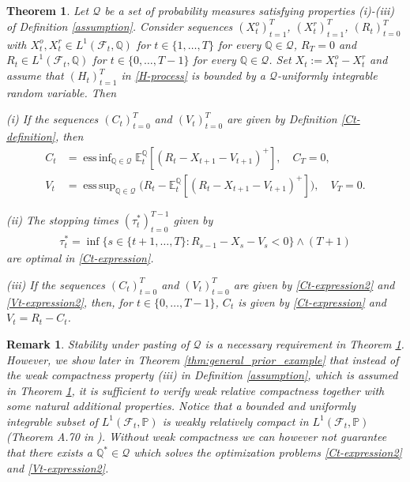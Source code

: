\documentclass[11pt,a4paper]{article}
\newtheorem{theorem}{Theorem}
\newtheorem{remark}{Remark}
\newcommand{\E}{\mathbb{E}}
\DeclareMathOperator*{\esssup}{ess\,sup}
\DeclareMathOperator*{\essinf}{ess\,inf}
\renewcommand{\P}{\mathbb{P}}
\newcommand{\Q}{\mathbb{Q}}
\newcommand{\calF}{\mathcal{F}}
\newcommand{\calQ}{\mathcal{Q}}
\begin{document}
\begin{theorem}\label{Vt-def-thm} 
Let $\calQ$ be a set of probability measures satisfying properties (i)-(iii) of Definition \ref{assumption}. 
Consider sequences $(X^{o}_t)_{t=1}^T$, $(X^{r}_t)_{t=1}^T$, $(R_t)_{t=0}^T$ with $X^{o}_t,X^{r}_t\in L^{1}(\calF_t,\Q)$ for $t\in \{1,\dots,T\}$ for every $\Q\in\mathcal{Q}$, $R_T=0$ and $R_t\in L^{1}(\calF_t,\Q)$ for $t\in \{0,\dots,T-1\}$ for every $\Q\in\calQ$. Set $X_t:=X^{o}_t-X^{r}_t$ and assume that $(H_t)_{t=1}^T$ in \eqref{H-process} is bounded by a $\calQ$-uniformly integrable random variable. Then  

(i) 
If the sequences $(C_t)_{t=0}^T$ and $(V_t)_{t=0}^T$ are given by Definition \ref{Ct-definition}, then 
\begin{align} 
C_t &= \essinf_{\Q \in \calQ} \E_t^{\Q}[(R_t-X_{t+1}-V_{t+1})^+], \quad C_T=0, \label{Ct-expression2}\\
V_t &= \esssup_{\Q \in \calQ} \Big(R_t-\E_t^{\Q}[(R_t-X_{t+1}-V_{t+1})^+]\Big), \quad V_T=0. \label{Vt-expression2}
\end{align}

(ii) 
The stopping times $(\tau^*_t)_{t=0}^{T-1}$ given by 
\begin{align*} 
\tau^*_{t}=  \inf \{s \in \{t+1,\dots,T\} : R_{s-1}-X_{s}-V_{s}<0\} \wedge (T+1)
\end{align*}
are optimal in \eqref{Ct-expression}. 

(iii) 
If the sequences $(C_t)_{t=0}^T$ and $(V_t)_{t=0}^T$ are given by \eqref{Ct-expression2} and \eqref{Vt-expression2}, then, for $t\in\{0,\dots,T-1\}$, $C_t$ is given by \eqref{Ct-expression} and $V_t=R_t-C_t$. 
\end{theorem}

\begin{remark}
Stability under pasting of $\calQ$ is a necessary requirement in Theorem \ref{Vt-def-thm}. However, we show later in Theorem \ref{thm:general_prior_example} that instead of the weak compactness property (iii) in Definition \ref{assumption}, which is assumed in Theorem \ref{Vt-def-thm}, it is sufficient to verify weak relative compactness together with some natural additional properties. Notice that a bounded and uniformly integrable subset of $L^1(\calF_t,\P)$ is weakly relatively compact in $L^1(\calF_t,\P)$ (Theorem A.70 in \cite{Foellmer-Schied-16}). Without weak compactness we can however not guarantee that there exists a $\Q^*\in\calQ$ which solves the optimization problems \eqref{Ct-expression2} and \eqref{Vt-expression2}. 
\end{remark}
\end{document}

